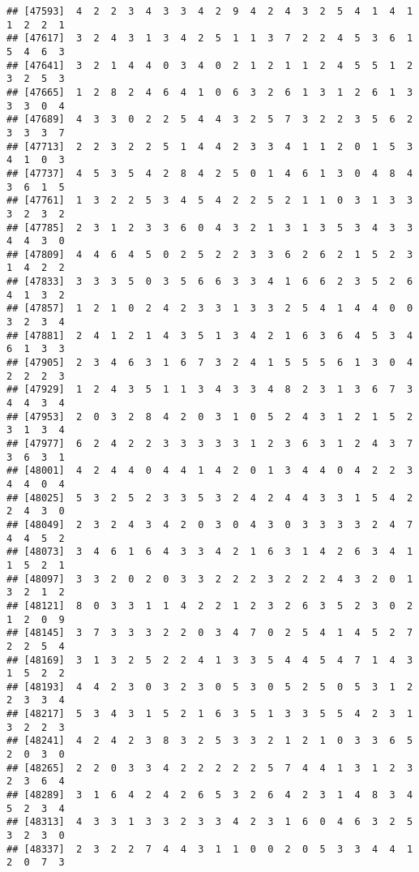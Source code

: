 \documentclass[
]{article}
\begin{document}
\begin{verbatim}
## [47593]  4  2  2  3  4  3  3  4  2  9  4  2  4  3  2  5  4  1  4  1  1  2  2  1
## [47617]  3  2  4  3  1  3  4  2  5  1  1  3  7  2  2  4  5  3  6  1  5  4  6  3
## [47641]  3  2  1  4  4  0  3  4  0  2  1  2  1  1  2  4  5  5  1  2  3  2  5  3
## [47665]  1  2  8  2  4  6  4  1  0  6  3  2  6  1  3  1  2  6  1  3  3  3  0  4
## [47689]  4  3  3  0  2  2  5  4  4  3  2  5  7  3  2  2  3  5  6  2  3  3  3  7
## [47713]  2  2  3  2  2  5  1  4  4  2  3  3  4  1  1  2  0  1  5  3  4  1  0  3
## [47737]  4  5  3  5  4  2  8  4  2  5  0  1  4  6  1  3  0  4  8  4  3  6  1  5
## [47761]  1  3  2  2  5  3  4  5  4  2  2  5  2  1  1  0  3  1  3  3  3  2  3  2
## [47785]  2  3  1  2  3  3  6  0  4  3  2  1  3  1  3  5  3  4  3  3  4  4  3  0
## [47809]  4  4  6  4  5  0  2  5  2  2  3  3  6  2  6  2  1  5  2  3  1  4  2  2
## [47833]  3  3  3  5  0  3  5  6  6  3  3  4  1  6  6  2  3  5  2  6  4  1  3  2
## [47857]  1  2  1  0  2  4  2  3  3  1  3  3  2  5  4  1  4  4  0  0  3  2  3  4
## [47881]  2  4  1  2  1  4  3  5  1  3  4  2  1  6  3  6  4  5  3  4  6  1  3  3
## [47905]  2  3  4  6  3  1  6  7  3  2  4  1  5  5  5  6  1  3  0  4  2  2  2  3
## [47929]  1  2  4  3  5  1  1  3  4  3  3  4  8  2  3  1  3  6  7  3  4  4  3  4
## [47953]  2  0  3  2  8  4  2  0  3  1  0  5  2  4  3  1  2  1  5  2  3  1  3  4
## [47977]  6  2  4  2  2  3  3  3  3  3  1  2  3  6  3  1  2  4  3  7  3  6  3  1
## [48001]  4  2  4  4  0  4  4  1  4  2  0  1  3  4  4  0  4  2  2  3  4  4  0  4
## [48025]  5  3  2  5  2  3  3  5  3  2  4  2  4  4  3  3  1  5  4  2  2  4  3  0
## [48049]  2  3  2  4  3  4  2  0  3  0  4  3  0  3  3  3  3  2  4  7  4  4  5  2
## [48073]  3  4  6  1  6  4  3  3  4  2  1  6  3  1  4  2  6  3  4  1  1  5  2  1
## [48097]  3  3  2  0  2  0  3  3  2  2  2  3  2  2  2  4  3  2  0  1  3  2  1  2
## [48121]  8  0  3  3  1  1  4  2  2  1  2  3  2  6  3  5  2  3  0  2  1  2  0  9
## [48145]  3  7  3  3  3  2  2  0  3  4  7  0  2  5  4  1  4  5  2  7  2  2  5  4
## [48169]  3  1  3  2  5  2  2  4  1  3  3  5  4  4  5  4  7  1  4  3  1  5  2  2
## [48193]  4  4  2  3  0  3  2  3  0  5  3  0  5  2  5  0  5  3  1  2  2  3  3  4
## [48217]  5  3  4  3  1  5  2  1  6  3  5  1  3  3  5  5  4  2  3  1  3  2  2  3
## [48241]  4  2  4  2  3  8  3  2  5  3  3  2  1  2  1  0  3  3  6  5  2  0  3  0
## [48265]  2  2  0  3  3  4  2  2  2  2  2  5  7  4  4  1  3  1  2  3  2  3  6  4
## [48289]  3  1  6  4  2  4  2  6  5  3  2  6  4  2  3  1  4  8  3  4  5  2  3  4
## [48313]  4  3  3  1  3  3  2  3  3  4  2  3  1  6  0  4  6  3  2  5  3  2  3  0
## [48337]  2  3  2  2  7  4  4  3  1  1  0  0  2  0  5  3  3  4  4  1  2  0  7  3

\end{verbatim}
\end{document}
